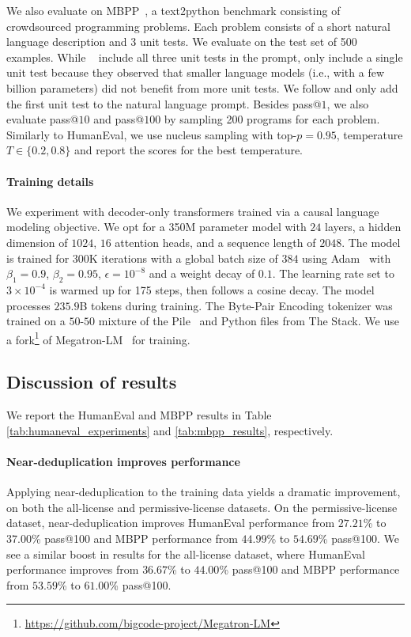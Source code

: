 We also evaluate on MBPP~\citep{austin2021program}, a text2python benchmark consisting of crowdsourced programming problems. Each problem consists of a short natural language description and 3 unit tests. We evaluate on the test set of 500 examples. While ~\citet{austin2021program} include all three unit tests in the prompt, \citet{fried2022incoder} only include a single unit test because they observed that smaller language models (i.e., with a few billion parameters) did not benefit from more unit tests. We follow \citet{fried2022incoder} and only add the first unit test to the natural language prompt. Besides pass@$1$, we also evaluate pass@$10$ and pass@$100$ by sampling 200 programs for each problem. Similarly to HumanEval, we use nucleus sampling with top-$p=0.95$, temperature $T\in \{0.2, 0.8\}$ and report the scores for the best temperature.

\paragraph{Training details} We experiment with decoder-only transformers trained via a causal language modeling objective. We opt for a 350M parameter model with $24$ layers, a hidden dimension of $1024$, $16$ attention heads, and a sequence length of $2048$. The model is trained for $300$K iterations with a global batch size of $384$ using Adam~\citep{DBLP:journals/corr/KingmaB14} with $\beta_1=0.9$, $\beta_2=0.95$, $\epsilon=10^{-8}$ and a weight decay of $0.1$. The learning rate set to $3\times10^{-4}$ is warmed up for 175 steps, then follows a cosine decay. The model processes $235.9$B tokens during training. The Byte-Pair Encoding tokenizer was trained on a $50$-$50$ mixture of the Pile~\citep{gao2020pile} and Python files from The Stack. We use a fork\footnote{\url{https://github.com/bigcode-project/Megatron-LM}} of Megatron-LM~\citep{shoeybi2019megatron} for training. 

\subsection{Discussion of results} We report the HumanEval and MBPP results in Table \ref{tab:humaneval_experiments} and \ref{tab:mbpp_results}, respectively. 

\paragraph{Near-deduplication improves performance} Applying near-deduplication to the training data yields a dramatic improvement, on both the all-license and permissive-license datasets. On the permissive-license dataset, near-deduplication improves HumanEval performance from $27.21$\% to $37.00$\% pass@100 and MBPP performance from $44.99$\% to $54.69$\% pass@100. We see a similar boost in results for the all-license dataset, where HumanEval performance improves from $36.67$\% to $44.00$\% pass@100 and MBPP performance from $53.59$\% to $61.00$\% pass@100. 

